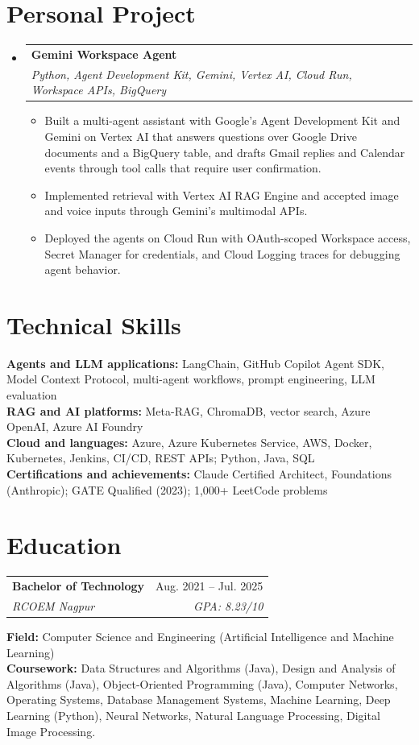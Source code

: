 \documentclass[a4paper,11pt]{article}
\makeatletter
\newcommand{\entry}[4]{\item\begin{tabularx}{\textwidth}{@{}Xr@{}}\textbf{#1}& #2\\\textit{\small #3}&\textit{\small #4}\end{tabularx}\vspace{-5pt}}
\newcommand{\bulletpoint}[1]{\item\small{#1}}
\makeatother
\begin{document}
\section{Personal Project}
\begin{itemize}[leftmargin=0in,label={}]
  \entry{Gemini Workspace Agent}{}{Python, Agent Development Kit, Gemini, Vertex AI, Cloud Run, Workspace APIs, BigQuery}{}
  \begin{itemize}
    \bulletpoint{Built a multi-agent assistant with Google's Agent Development Kit and Gemini on Vertex AI that answers questions over Google Drive documents and a BigQuery table, and drafts Gmail replies and Calendar events through tool calls that require user conf{}irmation.}
    \bulletpoint{Implemented retrieval with Vertex AI RAG Engine and accepted image and voice inputs through Gemini's multimodal APIs.}
    \bulletpoint{Deployed the agents on Cloud Run with OAuth-scoped Workspace access, Secret Manager for credentials, and Cloud Logging traces for debugging agent behavior.}
  \end{itemize}
\end{itemize}

\section{Technical Skills}
\small\textbf{Agents and LLM applications:} LangChain, GitHub Copilot Agent SDK, Model Context Protocol, multi-agent workf{}lows, prompt engineering, LLM evaluation \\
\textbf{RAG and AI platforms:} Meta-RAG, ChromaDB, vector search, Azure OpenAI, Azure AI Foundry \\
\textbf{Cloud and languages:} Azure, Azure Kubernetes Service, AWS, Docker, Kubernetes, Jenkins, CI/CD, REST APIs; Python, Java, SQL \\
\textbf{Certif{}ications and achievements:} Claude Certif{}ied Architect, Foundations (Anthropic); GATE Qualif{}ied (2023); 1,000+ LeetCode problems

\section{Education}
\begin{tabularx}{\textwidth}{@{}Xr@{}}
  \textbf{Bachelor of Technology} & Aug. 2021 -- Jul. 2025 \\
  \textit{\small RCOEM Nagpur} & \textit{\small GPA: 8.23/10} \\
\end{tabularx}
\small\textbf{Field:} Computer Science and Engineering (Artif{}icial Intelligence and Machine Learning)\\
\small\textbf{Coursework:} Data Structures and Algorithms (Java), Design and Analysis of Algorithms (Java), Object-Oriented Programming (Java), Computer Networks, Operating Systems, Database Management Systems, Machine Learning, Deep Learning (Python), Neural Networks, Natural Language Processing, Digital Image Processing.
\end{document}
